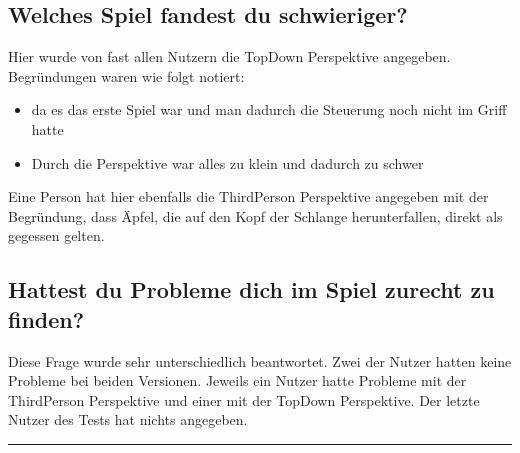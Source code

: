 \subsection{Welches Spiel fandest du schwieriger?}
Hier wurde von fast allen Nutzern die TopDown Perspektive angegeben. Begründungen waren wie folgt notiert:
\begin{itemize}
\item da es das erste Spiel war und man dadurch die Steuerung noch nicht im Griff hatte
\item Durch die Perspektive war alles zu klein und dadurch zu schwer
\end{itemize}
Eine Person hat hier ebenfalls die ThirdPerson Perspektive angegeben mit der Begründung, dass Äpfel, die auf den Kopf der Schlange herunterfallen, direkt als gegessen gelten.
\subsection{Hattest du Probleme dich im Spiel zurecht zu finden?}
Diese Frage wurde sehr unterschiedlich beantwortet. Zwei der Nutzer hatten keine Probleme bei beiden Versionen. Jeweils ein Nutzer hatte Probleme mit der ThirdPerson Perspektive und einer mit der TopDown Perspektive. Der letzte Nutzer des Tests hat nichts angegeben.
\hfil\rule{0.4\textwidth}{0.4pt}